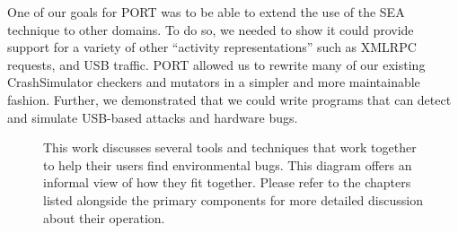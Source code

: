 One of our goals for PORT was to be able to extend the use of the SEA technique to other domains. To do so, we needed to show it could provide support for a variety of other ``activity representations'' such as XMLRPC requests, and USB traffic.
PORT allowed us to rewrite many of our existing CrashSimulator checkers and mutators in a simpler and more maintainable fashion.
Further, we demonstrated that we could write programs that can detect and simulate USB-based attacks and hardware bugs.


\begin{figure}[H]
  \center{}
    \setlength{\belowcaptionskip}{-16pt}
  \caption[Overview of Components]{This work discusses several tools and techniques that work together to help their users find environmental bugs.  This diagram offers an informal view of how they fit together.  Please refer to the chapters listed alongside the primary components for more detailed discussion about their operation.}
  \label{fig:overview}
\end{figure}


